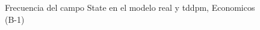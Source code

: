 \begin{figure}[H]
    \centering
    
    \caption{Frecuencia del campo State en el modelo real y tddpm, Economicos (B-1)}
    \label{frecuency-State-tddpm_mlp}
\end{figure}